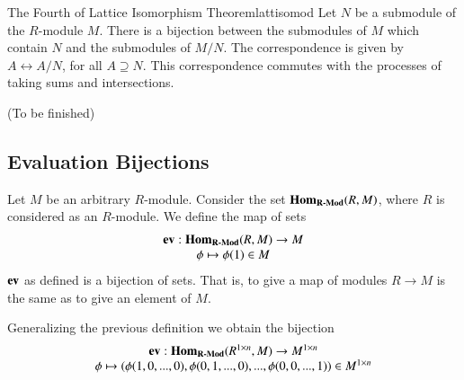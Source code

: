 \documentclass[12pt, a4paper, twoside, openright, titlepage]{book}
\begin{document}
\begin{namthm}{The Fourth of Lattice Isomorphism Theorem}{lattisomod}
    Let $N$ be a submodule of the $R$-module $M$. There is a bijection between the submodules of $M$ which contain $N$ and the submodules of $M/N$. The correspondence is given by $A\leftrightarrow A/N$, for all $A\supseteq N$. This correspondence commutes with the processes of taking sums and intersections.
\end{namthm}
\begin{proof*}{}{}
    (To be finished)
\end{proof*}



\subsection{\textsection Evaluation Bijections}

\begin{defn}{}{}
    Let $M$ be an arbitrary $R$-module. Consider the set $\mathbf{Hom}_{\normalfont\textbf{R-Mod}}(R,M)$, where $R$ is considered as an $R$-module. We define the map of sets \begin{equation}
        \begin{array}{c} \operatorname{\bf{ev}}:\mathbf{Hom}_{\normalfont\textbf{R-Mod}}(R,M) \rightarrow M \\ \phi\mapsto \phi(1) \in M \end{array}
    \end{equation}
    $\operatorname{\bf{ev}}$ as defined is a bijection of sets. That is, to give a map of modules $R\rightarrow M$ is the same as to give an element of $M$.
\end{defn}

\begin{defn}{}{}
    Generalizing the previous definition we obtain the bijection \begin{equation}
        \begin{array}{c} \operatorname{\bf{ev}}:\mathbf{Hom}_{\normalfont\textbf{R-Mod}}(R^{1\times n},M) \rightarrow M^{1\times n} \\ \phi\mapsto (\phi(1,0,...,0),\phi(0,1,...,0),...,\phi(0,0,...,1)) \in M^{1\times n} \end{array}
    \end{equation}
\end{defn}
\end{document}
